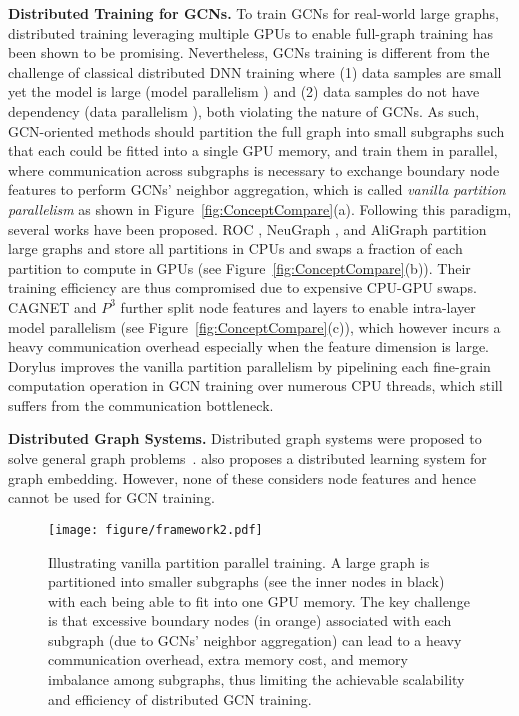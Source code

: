 \documentclass{article}
\newcommand{\niparagraph}[1]{\noindent\textbf{#1}}
\begin{document}
\niparagraph{Distributed Training for GCNs.}
To train GCNs for real-world large graphs, distributed training leveraging multiple GPUs to enable full-graph training has been shown to be promising.  
Nevertheless, GCNs training is different from the challenge of classical distributed DNN training where (1) data samples are small yet the model is large (model parallelism \citep{krizhevsky2014one,harlap2018pipedream}) and (2) data samples do not have dependency (data parallelism \citep{li2020pytorch,li2018pipe,li2018inceptionn}), both violating the nature of GCNs. As such,
GCN-oriented methods should partition the full graph into small subgraphs such that each could be fitted into a single GPU memory, and train them in parallel, where communication across subgraphs is necessary to exchange boundary node features to perform GCNs' neighbor aggregation, which is called \textit{vanilla partition parallelism} as shown in Figure~\ref{fig:ConceptCompare}(a).
Following this paradigm, several works have been proposed.
ROC \citep{jia2020improving}, NeuGraph \citep{ma2019neugraph}, and AliGraph \citep{zhu2019aligraph} partition large graphs and store all partitions in CPUs and swaps a fraction of each partition to compute in GPUs (see Figure~\ref{fig:ConceptCompare}(b)). 
Their training efficiency are thus compromised due to expensive CPU-GPU swaps.
CAGNET \citep{tripathy2020reducing} and $P^3$ \citep{gandhi2021p3} further split node features and layers to enable intra-layer model parallelism (see Figure~\ref{fig:ConceptCompare}(c)), which however incurs a heavy communication overhead especially when the feature dimension is large.
Dorylus \citep{thorpe2021dorylus} improves the vanilla partition parallelism by pipelining each fine-grain computation operation in GCN training over numerous CPU threads, which still suffers from the communication bottleneck.

\niparagraph{Distributed Graph Systems.}
Distributed graph systems were proposed to solve general graph problems~\citep{gonzalez2012powergraph,shun2013ligra,nguyen2013lightweight,zhu2016gemini,chen2019powerlyra}. 
\citep{lerer2019pytorch} also proposes a distributed learning system for graph embedding. 
However, none of these considers node features and hence cannot be used for GCN training.


 \begin{figure*}[t]
\begin{center}
\texttt{[image: figure/framework2.pdf]}
\end{center}
\caption{Illustrating vanilla partition parallel training. A large graph is partitioned into smaller subgraphs (see the inner nodes in black) with each being able to fit into one GPU memory. The key challenge is that excessive boundary nodes (in orange) associated with each subgraph (due to GCNs' neighbor aggregation) can lead to a heavy communication overhead, extra memory cost, and memory imbalance among subgraphs, thus limiting the achievable scalability and efficiency of distributed GCN training.}
\label{fig:framework}
\end{figure*}
\end{document}
